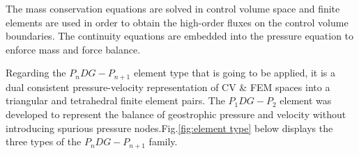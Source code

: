 \documentclass[12pt,a4paper,oneside]{report}%
\begin{document}
The mass conservation equations are solved in control volume space and finite elements are used in order to obtain the high-order fluxes on the control volume boundaries. The continuity equations are embedded into the pressure equation to enforce mass and force balance. 


Regarding the \textit{$P_n DG -P_{n+1}$} element type that is going to be applied, it is a dual consistent pressure-velocity representation of CV \& FEM spaces into a triangular and tetrahedral finite element pairs. The \textit{$P_1 DG -P_2$} element was developed to represent the balance of geostrophic pressure and velocity without introducing spurious pressure nodes.Fig.\ref{fig:element type} below displays the three types of the \textit{$P_n DG -P_{n+1}$} family.



\end{document}
